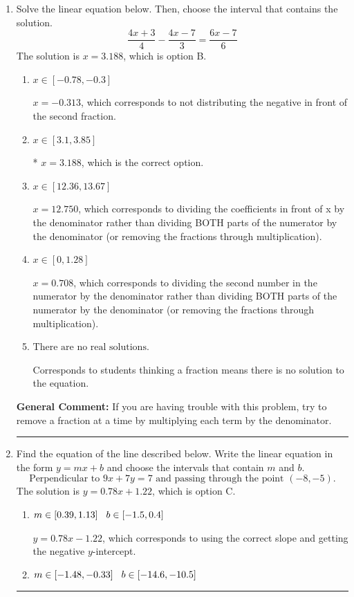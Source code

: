 \documentclass{extbook}[14pt]
\newcommand{\litem}[1]{\item #1

\rule{\textwidth}{0.4pt}}
\begin{document}
\begin{enumerate}\litem{
Solve the linear equation below. Then, choose the interval that contains the solution.
\[ \frac{4x + 3}{4} - \frac{4x -7}{3} = \frac{6x -7}{6} \]The solution is \( x = 3.188 \), which is option B.\begin{enumerate}[label=\Alph*.]
\item \( x \in [-0.78, -0.3] \)

 $x = -0.313$, which corresponds to not distributing the negative in front of the second fraction.
\item \( x \in [3.1, 3.85] \)

* $x = 3.188$, which is the correct option.
\item \( x \in [12.36, 13.67] \)

 $x = 12.750$, which corresponds to dividing the coefficients in front of x by the denominator rather than dividing BOTH parts of the numerator by the denominator (or removing the fractions through multiplication).
\item \( x \in [0, 1.28] \)

 $x = 0.708$, which corresponds to dividing the second number in the numerator by the denominator rather than dividing BOTH parts of the numerator by the denominator (or removing the fractions through multiplication).
\item \( \text{There are no real solutions.} \)

Corresponds to students thinking a fraction means there is no solution to the equation.
\end{enumerate}

\textbf{General Comment:} If you are having trouble with this problem, try to remove a fraction at a time by multiplying each term by the denominator.
}
\litem{
Find the equation of the line described below. Write the linear equation in the form $ y=mx+b $ and choose the intervals that contain $m$ and $b$.
\[ \text{Perpendicular to } 9 x + 7 y = 7 \text{ and passing through the point } (-8, -5). \]The solution is \( y = 0.78x + 1.22 \), which is option C.\begin{enumerate}[label=\Alph*.]
\item \( m \in [0.39, 1.13] \hspace*{3mm} b \in [-1.5, 0.4] \)

 $y = 0.78x - 1.22$, which corresponds to using the correct slope and getting the negative $y$-intercept.
\item \( m \in [-1.48, -0.33] \hspace*{3mm} b \in [-14.6, -10.5] \)


\end{enumerate}}
\end{enumerate}
\end{document}
